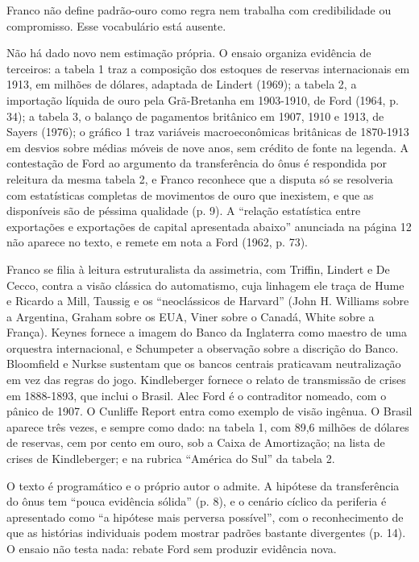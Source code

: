 Franco não define padrão-ouro como regra nem trabalha com credibilidade ou
compromisso. Esse vocabulário está ausente.


Não há dado novo nem estimação própria. O ensaio organiza evidência de
terceiros: a tabela 1 traz a composição dos estoques de reservas internacionais
em 1913, em milhões de dólares, adaptada de Lindert (1969); a tabela 2, a
importação líquida de ouro pela Grã-Bretanha em 1903-1910, de Ford (1964, p.
34); a tabela 3, o balanço de pagamentos britânico em 1907, 1910 e 1913, de
Sayers (1976); o gráfico 1 traz variáveis macroeconômicas britânicas de
1870-1913 em desvios sobre médias móveis de nove anos, sem crédito de fonte na
legenda. A contestação de Ford ao argumento da transferência do ônus é
respondida por releitura da mesma tabela 2, e Franco reconhece que a disputa só
se resolveria com estatísticas completas de movimentos de ouro que inexistem, e
que as disponíveis são de péssima qualidade (p. 9). A ``relação estatística
entre exportações e exportações de capital apresentada abaixo'' anunciada na
página 12 não aparece no texto, e remete em nota a Ford (1962, p. 73).


Franco se filia à leitura estruturalista da assimetria, com Triffin, Lindert e
De Cecco, contra a visão clássica do automatismo, cuja linhagem ele traça de
Hume e Ricardo a Mill, Taussig e os ``neoclássicos de Harvard'' (John H.
Williams sobre a Argentina, Graham sobre os EUA, Viner sobre o Canadá, White
sobre a França). Keynes fornece a imagem do Banco da Inglaterra como maestro de
uma orquestra internacional, e Schumpeter a observação sobre a discrição do
Banco. Bloomfield e Nurkse sustentam que os bancos centrais praticavam
neutralização em vez das regras do jogo. Kindleberger fornece o relato de
transmissão de crises em 1888-1893, que inclui o Brasil. Alec Ford é o
contraditor nomeado, com o pânico de 1907. O Cunliffe Report entra como exemplo
de visão ingênua. O Brasil aparece três vezes, e sempre como dado: na tabela 1,
com 89,6 milhões de dólares de reservas, cem por cento em ouro, sob a Caixa de
Amortização; na lista de crises de Kindleberger; e na rubrica ``América do
Sul'' da tabela 2.


O texto é programático e o próprio autor o admite. A hipótese da transferência
do ônus tem ``pouca evidência sólida'' (p. 8), e o cenário cíclico da periferia
é apresentado como ``a hipótese mais perversa possível'', com o reconhecimento
de que as histórias individuais podem mostrar padrões bastante divergentes (p.
14). O ensaio não testa nada: rebate Ford sem produzir evidência nova.


